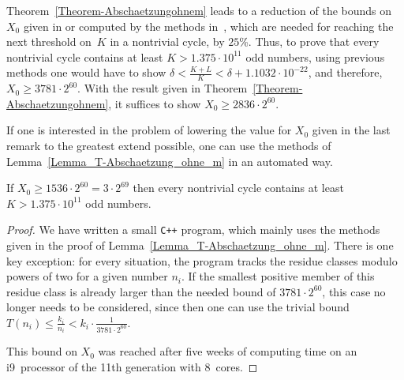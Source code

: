 \documentclass[12pt,reqno]{article}
\begin{document}
\begin{remark}\label{RemarkAbschaetzungohnem}
Theorem~\ref{Theorem-Abschaetzungohnem} leads to a reduction of the bounds on $X_0$ given in or computed by the methods in~\cite{SE}, which are needed for reaching the next threshold on~$K$ in a nontrivial cycle, by $25$\%. Thus, to prove that every nontrivial cycle contains at least $K> 1.375\cdot 10^{11}$  odd numbers, using previous methods one would have to show $\delta<\tfrac{K+L}{K}<\delta+1.1032\cdot 10^{-22}$, and therefore, $X_0\geq 3781\cdot 2^{60}$. With the result given in Theorem~\ref{Theorem-Abschaetzungohnem}, it suffices to show $X_0\geq 2836\cdot 2^{60}$.
\end{remark}

If one is interested in the problem of lowering the value for $X_0$ given in the last remark to the greatest extend possible, one can use the methods of Lemma~\ref{Lemma_T-Abschaetzung_ohne_m} in an automated way.

\begin{corollary}\label{Corollary_Computer-Bound}
If $X_0\geq 1536\cdot 2^{60}=3\cdot2^{69}$ then every nontrivial cycle contains at least $K> 1.375\cdot 10^{11}$  odd numbers. 
\end{corollary}

\begin{proof}
We have written a small {\tt C++} program, which mainly uses the methods given in the proof of  Lemma~\ref{Lemma_T-Abschaetzung_ohne_m}. There is one key exception: for every situation, the program tracks the residue classes modulo powers of two for a given number $n_i$. If the smallest positive member of this residue class is already larger than the needed bound of $3781\cdot 2^{60}$, this case no longer needs to be considered, since then one can use the trivial bound $T(n_i)\leq \tfrac{k_i}{n_i}<k_i \cdot \tfrac{1}{3781 \cdot 2^{60}}$.

This bound on $X_0$ was reached after five weeks of computing time on an i9~processor of the 11th generation with 8~cores.
\end{proof}
\end{document}
